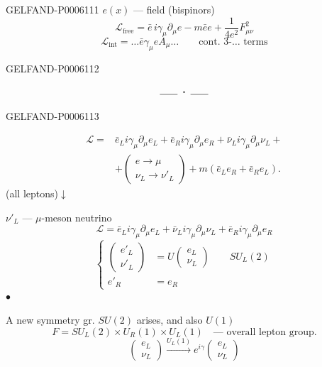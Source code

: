 \begin{GelfandAdjacentEvidence}{GELFAND-P000611}{1}
\(e(x)\) — field (bispinors)
\[
\mathcal L_{\mathrm{free}}=\bar e\,i\gamma_\mu\partial_\mu e
-m\bar e e+\frac1{4e^2}F_{\mu\nu}^2
\]
\[
\mathcal L_{\mathrm{int}}=\ldots\bar e\gamma_\mu e A_\mu\ldots
\qquad\text{cont. 3-… terms}
\]
\end{GelfandAdjacentEvidence}
\begin{GelfandAdjacentEvidence}{GELFAND-P000611}{2}

\[\rule{1.8em}{.4pt}\;\boldsymbol{\cdot}\;\rule{1.8em}{.4pt}\]
\end{GelfandAdjacentEvidence}
\begin{GelfandAdjacentEvidence}{GELFAND-P000611}{3}

\[
\begin{aligned}
\mathcal L={}&\bar e_L i\gamma_\mu\partial_\mu e_L
+\bar e_R i\gamma_\mu\partial_\mu e_R
+\bar\nu_L i\gamma_\mu\partial_\mu\nu_L+\\
&+\begin{pmatrix}e\to\mu\\ \nu_L\to\nu'_L\end{pmatrix}
+m(\bar e_L e_R+\bar e_R e_L).
\end{aligned}
\]
(all leptons)\quad\(\downarrow\)

\(\nu'_L\) — \(\mu\)-meson neutrino
\[
\mathcal L=\bar e_L i\gamma_\mu\partial_\mu e_L
+\bar\nu_L i\gamma_\mu\partial_\mu\nu_L
+\bar e_R i\gamma_\mu\partial_\mu e_R
\]
\[
\left\{
\begin{aligned}
\begin{pmatrix}e'_L\\\nu'_L\end{pmatrix}
&=U\begin{pmatrix}e_L\\\nu_L\end{pmatrix}
\qquad SU_L(2)\\
e'_R&=e_R
\end{aligned}
\right.
\]
\hfill\(\bullet\)

A new symmetry gr. \(SU(2)\) arises, and also \(U(1)\)
\[
F=SU_L(2)\times U_R(1)\times U_L(1)
\quad\text{— overall lepton group.}
\]
\[
\begin{pmatrix}e_L\\\nu_L\end{pmatrix}
\overset{U_L(1)}{\longrightarrow}
e^{i\gamma}\begin{pmatrix}e_L\\\nu_L\end{pmatrix}
\]
\end{GelfandAdjacentEvidence}
